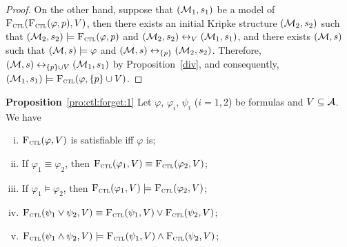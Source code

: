\documentclass{article}
\begin{document}
\begin{proof}
On the other hand, suppose that $({\cal M}_1, s_1)$ be a model of ${\textsc{F}_{\textsc{ctl}}}({\textsc{F}_{\textsc{ctl}}}(\varphi, p), V)$, then there exists an initial Kripke structure $({\cal M}_2, s_2)$ such that $({\cal M}_2, s_2) \models {\textsc{F}_{\textsc{ctl}}}(\varphi, p)$ and $({\cal M}_2, s_2) \leftrightarrow_V ({\cal M}_1, s_1)$, and there exists $({\cal M}, s)$ such that $({\cal M}, s) \models \varphi$ and $({\cal M}, s) \leftrightarrow_{\{p\}} ({\cal M}_2, s_2)$. Therefore, $({\cal M}, s) \leftrightarrow_{\{p\} \cup V} ({\cal M}_1, s_1)$ by Proposition~\ref{div}, and consequently, $({\cal M}_1, s_1) \models {\textsc{F}_{\textsc{ctl}}}(\varphi, \{p\} \cup V)$.
\end{proof}



\textbf{Proposition}~\ref{pro:ctl:forget:1}
Let $\varphi$, $\varphi_i$, $\psi_i$ ($i=1,2$) be formulas and $V\subseteq {\cal A}$. We have
\begin{enumerate}[(i)]
  \item ${\textsc{F}_{\textsc{ctl}}}(\varphi, V)$ is satisfiable iff $\varphi$ is;
  \item If $\varphi_1 \equiv \varphi_2$, then ${\textsc{F}_{\textsc{ctl}}}(\varphi_1, V) \equiv {\textsc{F}_{\textsc{ctl}}}(\varphi_2, V)$;
  \item If $\varphi_1 \models \varphi_2$, then ${\textsc{F}_{\textsc{ctl}}}(\varphi_1, V) \models {\textsc{F}_{\textsc{ctl}}}(\varphi_2, V)$;
  \item ${\textsc{F}_{\textsc{ctl}}}(\psi_1 \vee \psi_2, V) \equiv {\textsc{F}_{\textsc{ctl}}}(\psi_1, V) \vee {\textsc{F}_{\textsc{ctl}}}(\psi_2, V)$;
  \item ${\textsc{F}_{\textsc{ctl}}}(\psi_1 \wedge \psi_2, V) \models {\textsc{F}_{\textsc{ctl}}}(\psi_1, V) \wedge {\textsc{F}_{\textsc{ctl}}}(\psi_2, V)$;
\end{enumerate}
\end{document}
